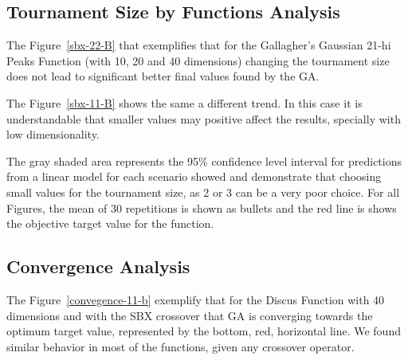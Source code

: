 \subsection{Tournament Size by Functions Analysis}
The Figure~\ref{sbx-22-B} that exemplifies that for the Gallagher's Gaussian 21-hi Peaks Function (with 10, 20 and 40 dimensions) changing the tournament size does not lead to significant better final values found by the GA. 

The Figure~\ref{sbx-11-B} shows the same a different trend. In this case it is understandable that smaller values may positive affect the results, specially with low dimensionality. 

The gray shaded area represents the 95\% confidence level interval for predictions from a linear model for each scenario showed and demonstrate that choosing small values for the tournament size, as 2 or 3 can be a very poor choice. For all Figures, the mean of 30 repetitions is shown as bullets and the red line is shows the objective target value for the function.


\subsection{Convergence Analysis}
The Figure~\ref{convegence-11-b} exemplify that for the Discus Function with 40 dimensions and with the SBX crossover that GA is converging towards the optimum target value, represented by the bottom, red, horizontal line. We found similar behavior in most of the functions, given any crossover operator.

%

